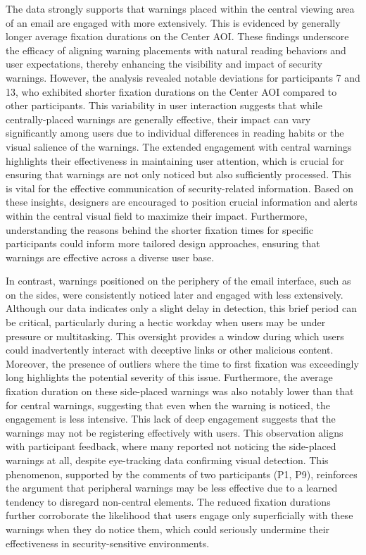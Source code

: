 \documentclass[
  a4paper,  %
  twoside,  %
  bibliography=totoc,
  headsepline,
  cleardoublepage=empty,
  parskip=half,
  draft=false
]{scrbook}
\begin{document}
The data strongly supports that warnings placed within the central viewing area of an email are engaged with more extensively. This is evidenced by generally longer average fixation durations on the Center AOI. These findings underscore the efficacy of aligning warning placements with natural reading behaviors and user expectations, thereby enhancing the visibility and impact of security warnings. \newline However, the analysis revealed notable deviations for participants 7 and 13, who exhibited shorter fixation durations on the Center AOI compared to other participants. This variability in user interaction suggests that while centrally-placed warnings are generally effective, their impact can vary significantly among users due to individual differences in reading habits or the visual salience of the warnings. \newline
The extended engagement with central warnings highlights their effectiveness in maintaining user attention, which is crucial for ensuring that warnings are not only noticed but also sufficiently processed. This is vital for the effective communication of security-related information. Based on these insights, designers are encouraged to position crucial information and alerts within the central visual field to maximize their impact. Furthermore, understanding the reasons behind the shorter fixation times for specific participants could inform more tailored design approaches, ensuring that warnings are effective across a diverse user base.

In contrast, warnings positioned on the periphery of the email interface, such as on the sides, were consistently noticed later and engaged with less extensively. Although our data indicates only a slight delay in detection, this brief period can be critical, particularly during a hectic workday when users may be under pressure or multitasking. This oversight provides a window during which users could inadvertently interact with deceptive links or other malicious content. Moreover, the presence of outliers where the time to first fixation was exceedingly long highlights the potential severity of this issue. \newline
Furthermore, the average fixation duration on these side-placed warnings was also notably lower than that for central warnings, suggesting that even when the warning is noticed, the engagement is less intensive. This lack of deep engagement suggests that the warnings may not be registering effectively with users. This observation aligns with participant feedback, where many reported not noticing the side-placed warnings at all, despite eye-tracking data confirming visual detection. \newline
This phenomenon, supported by the comments of two participants (P1, P9), reinforces the argument that peripheral warnings may be less effective due to a learned tendency to disregard non-central elements. The reduced fixation durations further corroborate the likelihood that users engage only superficially with these warnings when they do notice them, which could seriously undermine their effectiveness in security-sensitive environments.
\end{document}

